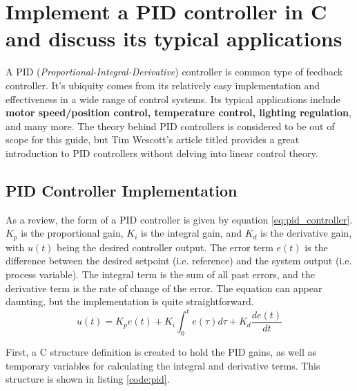\documentclass[main.tex]{subfiles}
\begin{document}
\section{Implement a PID controller in C and discuss its typical applications}

\spoilerline

\noindent A PID (\textit{Proportional-Integral-Derivative}) controller is common type of feedback controller. It's ubiquity comes from its relatively easy implementation and effectiveness in a wide range of control systems. Its typical applications include \textbf{motor speed/position control, temperature control, lighting regulation}, and many more. The theory behind PID controllers is considered to be out of scope for this guide, but Tim Wescott's article titled  provides a great introduction to PID controllers without delving into linear control theory.

\subsection{PID Controller Implementation}
As a review, the form of a PID controller is given by equation \eqref{eq:pid_controller}. $K_p$ is the proportional gain, $K_i$ is the integral gain, and $K_d$ is the derivative gain, with $u(t)$ being the desired controller output. The error term $e(t)$ is the difference between the desired setpoint (i.e. reference) and the system output (i.e. process variable). The integral term is the sum of all past errors, and the derivative term is the rate of change of the error. The equation can appear daunting, but the implementation is quite straightforward.
\begin{equation}
    u(t) = K_p e(t) + K_i \int_{0}^{t} e(\tau) d\tau + K_d \frac{de(t)}{dt}
    \label{eq:pid_controller}
\end{equation}

\noindent First, a C structure definition is created to hold the PID gains, as well as temporary variables for calculating the integral and derivative terms. This structure is shown in listing \ref{code:pid}.

\end{document}
